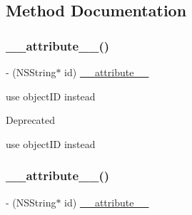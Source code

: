 \subsection{Method Documentation}
\mbox{\label{protocolFBOpenGraphObject-p_a91cba0c24949be9c3158598b20fc276e}} 
\subsubsection{\texorpdfstring{\+\_\+\+\_\+attribute\+\_\+\+\_\+()}{\_\_attribute\_\_()}\hspace{0.1cm}{\footnotesize\ttfamily [1/5]}}
{\footnotesize\ttfamily -\/ (N\+S\+String$\ast$ id) \hyperlink{struct____attribute____}{\+\_\+\+\_\+attribute\+\_\+\+\_\+} \begin{DoxyParamCaption}\item[{((deprecated(\char`\"{}use object\+ID instead\char`\"{})))}]{ }\end{DoxyParamCaption}}

use object\+ID instead \begin{DoxyRefDesc}{Deprecated}
\item[\hyperlink{deprecated__deprecated000204}{Deprecated}]use object\+ID instead \end{DoxyRefDesc}
\mbox{\label{protocolFBOpenGraphObject-p_a91cba0c24949be9c3158598b20fc276e}} 
\subsubsection{\texorpdfstring{\+\_\+\+\_\+attribute\+\_\+\+\_\+()}{\_\_attribute\_\_()}\hspace{0.1cm}{\footnotesize\ttfamily [2/5]}}
{\footnotesize\ttfamily -\/ (N\+S\+String$\ast$ id) \hyperlink{struct____attribute____}{\+\_\+\+\_\+attribute\+\_\+\+\_\+} \begin{DoxyParamCaption}\item[{((deprecated(\char`\"{}use object\+ID instead\char`\"{})))}]{ }\end{DoxyParamCaption}}

